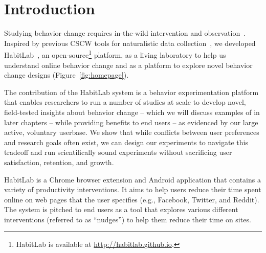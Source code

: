 \section{Introduction}



Studying behavior change requires in-the-wild intervention and observation~\cite{consolvo2008activity}. Inspired by previous CSCW tools for naturalistic data collection~\cite{reinecke2015labinthewild}, we developed HabitLab~\cite{habitlab}, an open-source\footnote{HabitLab is available at \url{http://habitlab.github.io}.} platform, as a living laboratory to help us understand online behavior change and as a platform to explore novel behavior change designs (Figure~\ref{fig:homepage}).

The contribution of the HabitLab system is a behavior experimentation platform that enables researchers to run a number of studies at scale to develop novel, field-tested insights about behavior change -- which we will discuss examples of in later chapters -- while providing benefits to end users -- as evidenced by our large active, voluntary userbase. We show that while conflicts between user preferences and research goals  often exist, we can design our experiments to navigate this tradeoff and run scientifically sound experiments without sacrificing user satisfaction, retention, and growth.



HabitLab is a Chrome browser extension and Android application that contains a variety of productivity interventions. It aims to help users reduce their time spent online on web pages that the user specifies (e.g., Facebook, Twitter, and Reddit). The system is pitched to end users as a tool that explores various different interventions (referred to as ``nudges'') to help them reduce their time on sites.



